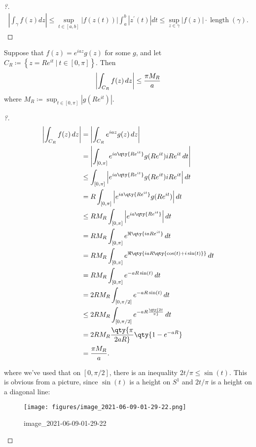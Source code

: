 \begin{proof}[?]

\begin{align*}
\left|\int_{\gamma} f(z) d z\right| \leq \sup _{t \in[a, b]}|f(z(t))| \int_{a}^{b}\left|z^{\prime}(t)\right| d t \leq \sup _{z \in \gamma}|f(z)| \cdot \operatorname{length}(\gamma)
.\end{align*}

\end{proof}

\begin{proposition}

Suppose that \(f(z) = e^{iaz}g(z)\) for some \(g\), and let
\(C_R \coloneqq\left\{{ z=Re^{it} {~\mathrel{\Big|}~}t\in [0, \pi] }\right\}\).
Then
\begin{align*}
{\left\lvert {\int_{C_R} f(z) \,dz} \right\rvert} \leq {\pi M_R \over a}
\end{align*}
where
\(M_R \coloneqq\sup_{t\in [0, \pi]} {\left\lvert {g(Re^{it})} \right\rvert}\).

\end{proposition}

\begin{proof}[?]

\begin{align*}
{\left\lvert { \int_{C_R} f(z)\,dz} \right\rvert}
&= {\left\lvert { \int_{C_R} e^{iaz}g(z) \,dz} \right\rvert} \\
&= {\left\lvert { \int_{[0, \pi]} e^{ia\qty{Re^{it}}}g(Re^{it}) iRe^{it} \,dt} \right\rvert} \\
&\leq \int_{[0, \pi]} {\left\lvert { e^{ia\qty{Re^{it}}}g(Re^{it}) iRe^{it}} \right\rvert} \,dt\\
&=R \int_{[0, \pi]} {\left\lvert { e^{ia\qty{Re^{it}}}g(Re^{it})} \right\rvert} \,dt\\
&\leq R M_R \int_{[0, \pi]} {\left\lvert { e^{ia\qty{Re^{it}}}} \right\rvert} \,dt\\
&= R M_R \int_{[0, \pi]} e^{\Re\qty{iaRe^{it}}}   \,dt\\
&= R M_R \int_{[0, \pi]} e^{\Re\qty{iaR\qty{\cos(t) + i\sin(t) } }}   \,dt\\
&= R M_R \int_{[0, \pi]} e^{-aR\sin(t) }   \,dt\\
&= 2 R M_R \int_{[0, \pi/2]} e^{-aR\sin(t) }   \,dt\\
&\leq 2R M_R \int_{[0, \pi/2]} e^{-aR\qty{2t\over \pi} }   \,dt\\
&= 2RM_R \qty{\pi \over 2aR}\qty{1-e^{-aR}} \\
&= {\pi M_R \over a}
.\end{align*}

where we've used that on \([0, \pi/2]\), there is an inequality
\(2t/\pi \leq \sin(t)\). This is obvious from a picture, since
\(\sin(t)\) is a height on \(S^1\) and \(2t/\pi\) is a height on a
diagonal line:

\begin{figure}
\centering
\texttt{[image: figures/image\_2021-06-09-01-29-22.png]}
\caption{image\_2021-06-09-01-29-22}
\end{figure}

\end{proof}

